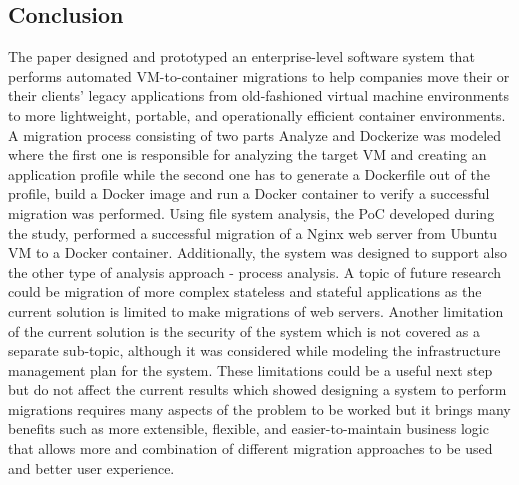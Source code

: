 \documentclass{article}
\begin{document}
\begin{multicols}{2}
\section{Conclusion}
The paper designed and prototyped an enterprise-level software system that performs automated VM-to-container migrations to help companies move their or their clients' legacy applications from old-fashioned virtual machine environments to more lightweight, portable, and operationally efficient container environments. A migration process consisting of two parts Analyze and Dockerize was modeled where the first one is responsible for analyzing the target VM and creating an application profile while the second one has to generate a Dockerfile out of the profile, build a Docker image and run a Docker container to verify a successful migration was performed. Using file system analysis, the PoC developed during the study, performed a successful migration of a Nginx web server from Ubuntu VM to a Docker container. Additionally, the system was designed to support also the other type of analysis approach - process analysis. A topic of future research could be migration of more complex stateless and stateful applications as the current solution is limited to make migrations of web servers. Another limitation of the current solution is the security of the system which is not covered as a separate sub-topic, although it was considered while modeling the infrastructure management plan for the system. These limitations could be a useful next step but do not affect the current results which showed designing a system to perform migrations requires many aspects of the problem to be worked but it brings many benefits such as more extensible, flexible, and easier-to-maintain business logic that allows more and combination of different migration approaches to be used and better user experience.

\printbibliography
\end{multicols}
\end{document}
